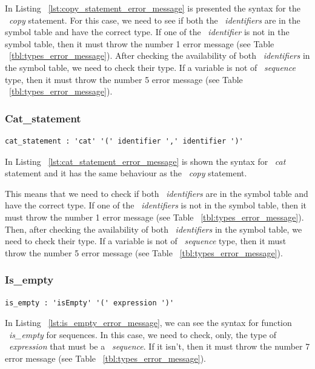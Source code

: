 \documentclass[
  oneside,
  11pt, a4paper,
  footinclude=true,
  headinclude=true,
  cleardoublepage=empty
]{scrbook}
\begin{document}
In Listing ~\ref{lst:copy_statement_error_message} is presented the syntax for the ~\textit{copy} statement.
For this case, we need to see if both the ~\textit{identifiers} are in the symbol table and have the correct type.
If one of the ~\textit{identifier} is not in the symbol table, then it must throw the number 1 error message (see Table ~\ref{tbl:types_error_message}).
After checking the availability of both ~\textit{identifiers} in the symbol table, we need to check their type.
If a variable is not of ~\textit{sequence} type, then it must throw the number 5 error message (see Table ~\ref{tbl:types_error_message}).

\subsubsection{Cat\_statement}

\begin{lstlisting}[caption={Cat\_statement rule in LISS},label={lst:cat_statement_error_message}]
  cat_statement : 'cat' '(' identifier ',' identifier ')'
\end{lstlisting}

In Listing ~\ref{lst:cat_statement_error_message} is shown the syntax for ~\textit{cat} statement and it has the same behaviour as the ~\textit{copy} statement.

This means that we need to check if both ~\textit{identifiers} are in the symbol table and have the correct type.
If one of the ~\textit{identifiers} is not in the symbol table, then it must throw the number 1 error message (see Table ~\ref{tbl:types_error_message}).
Then, after checking the availability of both ~\textit{identifiers} in the symbol table, we need to check their type. If a variable is not of ~\textit{sequence} type, then it must throw the number 5 error message (see Table ~\ref{tbl:types_error_message}).

\subsubsection{Is\_empty}

\begin{lstlisting}[caption={Is\_empty rule in LISS}, label={lst:is_empty_error_message}]
  is_empty : 'isEmpty' '(' expression ')'
\end{lstlisting}

In Listing ~\ref{lst:is_empty_error_message}, we can see the syntax for function ~\textit{is\_empty} for sequences.
In this case, we need to check, only, the type of ~\textit{expression} that must be a ~\textit{sequence}. If it isn't, then it must throw the number 7 error message (see Table ~\ref{tbl:types_error_message}).
\end{document}
